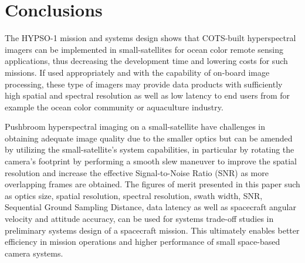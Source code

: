 \section{Conclusions} \label{sec:conclusions}
The HYPSO-1 mission and systems design shows that COTS-built hyperspectral imagers can be implemented in small-satellites for ocean color remote sensing applications, thus decreasing the development time and lowering costs for such missions. If used appropriately and with the capability of on-board image processing, these type of imagers may provide data products with sufficiently high spatial and spectral resolution as well as low latency to end users from for example the ocean color community or aquaculture industry. 

Pushbroom hyperspectral imaging on a small-satellite have challenges in obtaining adequate image quality due to the smaller optics but can be amended by utilizing the small-satellite's system capabilities, in particular by rotating the camera's footprint by performing a smooth slew maneuver to improve the spatial resolution and increase the effective Signal-to-Noise Ratio (SNR) as more overlapping frames are obtained. The figures of merit presented in this paper such as optics size, spatial resolution, spectral resolution, swath width, SNR, Sequential Ground Sampling Distance, data latency as well as spacecraft angular velocity and attitude accuracy, can be used for systems trade-off studies in preliminary systems design of a spacecraft mission. This ultimately enables better efficiency in mission operations and higher performance of small space-based camera systems. 

